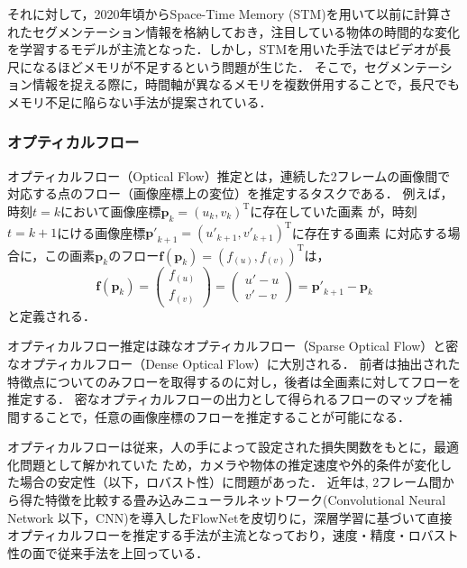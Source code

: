 それに対して，2020年頃からSpace-Time Memory (STM)\cite{oh2019video}を用いて以前に計算されたセグメンテーション情報を格納しておき，注目している物体の時間的な変化を学習するモデルが主流となった．しかし，STMを用いた手法ではビデオが長尺になるほどメモリが不足するという問題が生じた．
そこで，セグメンテーション情報を捉える際に，時間軸が異なるメモリを複数併用することで，長尺でもメモリ不足に陥らない手法が提案されている\cite{cheng2022xmem}．

\subsubsection{オプティカルフロー}\label{subsec:optical_flow}

オプティカルフロー（Optical Flow）推定とは，連続した2フレームの画像間で対応する点のフロー（画像座標上の変位）を推定するタスクである．
例えば，時刻$t=k$において画像座標$\mathbf{p}_k={(u_k,v_k)}^\mathrm{T}$に存在していた画素
が，時刻$t=k+1$にける画像座標${\mathbf{p}'}_{k+1}={( {u'}_{k+1}, {v'}_{k+1})}^\mathrm{T}$に存在する画素
に対応する場合に，この画素$\mathbf{p}_k$のフロー$\mathbf{f}(\mathbf{p}_k)=(f_{(u)},f_{(v)})^\mathrm{T}$は，
\begin{equation}
    \mathbf{f}(\mathbf{p}_k)=
\left(
\begin{array}{c}
     f_{(u)}  \\
     f_{(v)} 
\end{array}
\right)
=
\left(
\begin{array}{c}
     u'-u  \\
     v'-v
\end{array}
\right)
={\mathbf{p'}}_{k+1}-\mathbf{p}_k
\end{equation}
と定義される．

オプティカルフロー推定は疎なオプティカルフロー（Sparse Optical Flow）と密なオプティカルフロー（Dense Optical Flow）に大別される．
前者は抽出された特徴点についてのみフローを取得するのに対し，後者は全画素に対してフローを推定する．
密なオプティカルフローの出力として得られるフローのマップを補間することで，任意の画像座標のフローを推定することが可能になる．

オプティカルフローは従来，人の手によって設定された損失関数をもとに，最適化問題として解かれていた
\cite{chen2016full,horn1981determining,zach2007duality}ため，カメラや物体の推定速度や外的条件が変化した場合の安定性（以下，ロバスト性）に問題があった．
近年は,
2フレーム間から得た特徴を比較する畳み込みニューラルネットワーク(Convolutional Neural Network 以下，CNN)を導入したFlowNet\cite{dosovitskiy2015flownet}を皮切りに，深層学習に基づいて直接オプティカルフローを推定する手法が主流となっており，速度・精度・ロバスト性の面で従来手法を上回っている．

